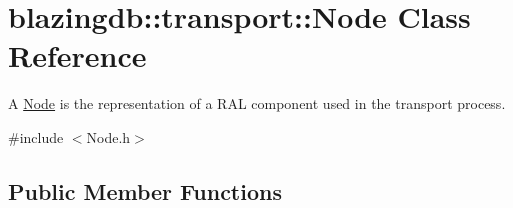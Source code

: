 \hypertarget{classblazingdb_1_1transport_1_1Node}{}\section{blazingdb\+:\+:transport\+:\+:Node Class Reference}
\label{classblazingdb_1_1transport_1_1Node}


A \hyperlink{classblazingdb_1_1transport_1_1Node}{Node} is the representation of a R\+AL component used in the transport process.  




{\ttfamily \#include $<$Node.\+h$>$}

\subsection*{Public Member Functions}
